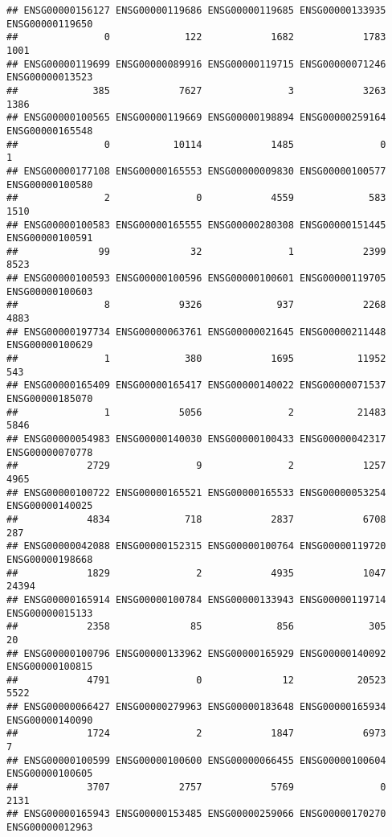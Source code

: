 \documentclass[
]{article}
\begin{document}
\begin{verbatim}
## ENSG00000156127 ENSG00000119686 ENSG00000119685 ENSG00000133935 ENSG00000119650 
##               0             122            1682            1783            1001 
## ENSG00000119699 ENSG00000089916 ENSG00000119715 ENSG00000071246 ENSG00000013523 
##             385            7627               3            3263            1386 
## ENSG00000100565 ENSG00000119669 ENSG00000198894 ENSG00000259164 ENSG00000165548 
##               0           10114            1485               0               1 
## ENSG00000177108 ENSG00000165553 ENSG00000009830 ENSG00000100577 ENSG00000100580 
##               2               0            4559             583            1510 
## ENSG00000100583 ENSG00000165555 ENSG00000280308 ENSG00000151445 ENSG00000100591 
##              99              32               1            2399            8523 
## ENSG00000100593 ENSG00000100596 ENSG00000100601 ENSG00000119705 ENSG00000100603 
##               8            9326             937            2268            4883 
## ENSG00000197734 ENSG00000063761 ENSG00000021645 ENSG00000211448 ENSG00000100629 
##               1             380            1695           11952             543 
## ENSG00000165409 ENSG00000165417 ENSG00000140022 ENSG00000071537 ENSG00000185070 
##               1            5056               2           21483            5846 
## ENSG00000054983 ENSG00000140030 ENSG00000100433 ENSG00000042317 ENSG00000070778 
##            2729               9               2            1257            4965 
## ENSG00000100722 ENSG00000165521 ENSG00000165533 ENSG00000053254 ENSG00000140025 
##            4834             718            2837            6708             287 
## ENSG00000042088 ENSG00000152315 ENSG00000100764 ENSG00000119720 ENSG00000198668 
##            1829               2            4935            1047           24394 
## ENSG00000165914 ENSG00000100784 ENSG00000133943 ENSG00000119714 ENSG00000015133 
##            2358              85             856             305              20 
## ENSG00000100796 ENSG00000133962 ENSG00000165929 ENSG00000140092 ENSG00000100815 
##            4791               0              12           20523            5522 
## ENSG00000066427 ENSG00000279963 ENSG00000183648 ENSG00000165934 ENSG00000140090 
##            1724               2            1847            6973               7 
## ENSG00000100599 ENSG00000100600 ENSG00000066455 ENSG00000100604 ENSG00000100605 
##            3707            2757            5769               0            2131 
## ENSG00000165943 ENSG00000153485 ENSG00000259066 ENSG00000170270 ENSG00000012963 

\end{verbatim}
\end{document}
